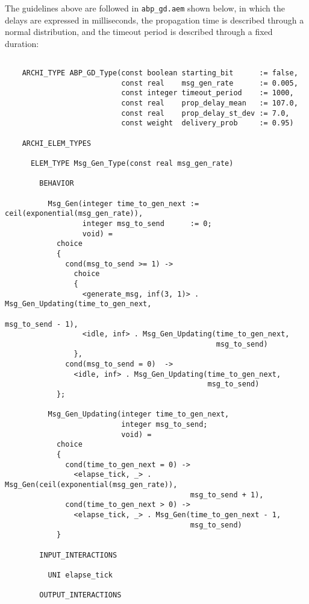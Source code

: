 The guidelines above are followed in {\tt abp\_gd.aem} shown below, in which the delays are expressed in
milliseconds, the propagation time is described through a normal distribution, and the timeout period is
described through a fixed duration:

	\begin{verbatim}

    ARCHI_TYPE ABP_GD_Type(const boolean starting_bit      := false,
                           const real    msg_gen_rate      := 0.005,
                           const integer timeout_period    := 1000,
                           const real    prop_delay_mean   := 107.0,
                           const real    prop_delay_st_dev := 7.0,
                           const weight  delivery_prob     := 0.95)

    ARCHI_ELEM_TYPES

      ELEM_TYPE Msg_Gen_Type(const real msg_gen_rate)

        BEHAVIOR

          Msg_Gen(integer time_to_gen_next := ceil(exponential(msg_gen_rate)),
                  integer msg_to_send      := 0;
                  void) =
            choice
            {
              cond(msg_to_send >= 1) ->
                choice
                {
                  <generate_msg, inf(3, 1)> . Msg_Gen_Updating(time_to_gen_next,
                                                               msg_to_send - 1),
                  <idle, inf> . Msg_Gen_Updating(time_to_gen_next,
                                                 msg_to_send)
                },
              cond(msg_to_send = 0)  ->
                <idle, inf> . Msg_Gen_Updating(time_to_gen_next,
                                               msg_to_send)
            };

          Msg_Gen_Updating(integer time_to_gen_next,
                           integer msg_to_send;
                           void) =
            choice
            {
              cond(time_to_gen_next = 0) ->
                <elapse_tick, _> . Msg_Gen(ceil(exponential(msg_gen_rate)),
                                           msg_to_send + 1),
              cond(time_to_gen_next > 0) ->
                <elapse_tick, _> . Msg_Gen(time_to_gen_next - 1,
                                           msg_to_send)
            }

        INPUT_INTERACTIONS

          UNI elapse_tick

        OUTPUT_INTERACTIONS


\end{verbatim}
